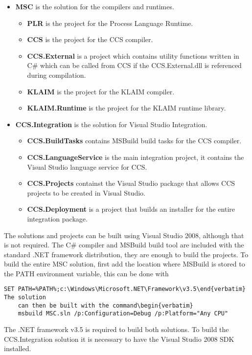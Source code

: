 	\begin{itemize}
		\item \textbf{MSC} is the solution for the compilers and runtimes.
		\begin{itemize}
			\item \textbf{PLR} is the project for the Process Language Runtime.
			\item \textbf{CCS} is the project for the CCS compiler.
			\item \textbf{CCS.External} is a project which contains utility 
			functions written in C\# which can be called from CCS if the 
			CCS.External.dll is referenced during compilation.
			\item \textbf{KLAIM} is the project for the KLAIM compiler.
			\item \textbf{KLAIM.Runtime} is the project for the KLAIM runtime 
			library.
		\end{itemize}
		\item \textbf{CCS.Integration} is the solution for Visual Studio 
		Integration.
		\begin{itemize}
			\item \textbf{CCS.BuildTasks} contains MSBuild build tasks for the CCS 
			compiler.
			\item \textbf{CCS.LanguageService} is the main integration project, it 
			contains the Visual Studio language service for CCS.
			\item \textbf{CCS.Projects} containst the Visual Studio package that 
			allows CCS projects to be created in Visual Studio.
			\item \textbf{CCS.Deployment} is a project that builds an installer for 
			the entire integration package.
		\end{itemize}
	\end{itemize}
	
	The solutions and projects can be built using Visual Studio 2008, although 
	that is not required. The C\# compiler and MSBuild build tool are included 
	with the standard .NET framework distribution, they are enough to build the 
	projects. To build the entire MSC solution, first add the location where
	MSBuild is stored to the PATH environment variable, this can be done with 
	\begin{verbatim}SET PATH=%PATH%;c:\Windows\Microsoft.NET\Framework\v3.5\end{verbatim} The solution 
	can then be built with the command\begin{verbatim} 
	msbuild MSC.sln /p:Configuration=Debug /p:Platform="Any CPU"
	\end{verbatim}
	The .NET framework v3.5 is required to build both solutions. To build the
	CCS.Integration solution it is necessary to have the Visual Studio 2008 SDK 
	installed.
	
